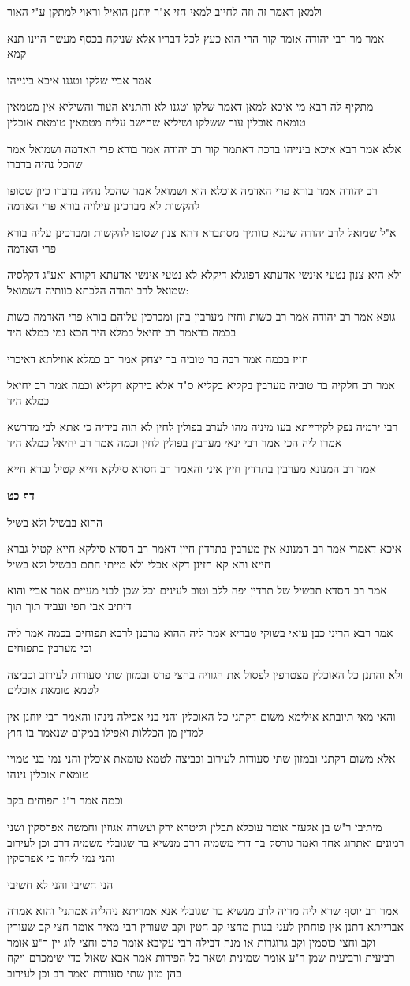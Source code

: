 \documentclass[12pt, openany]{book}
\newcommand{\sethebfont}{
\fontsize{10.5pt}{21.0pt} \selectfont
}
\newcommand{\textblock}[1]{
{\sethebfont #1\\}	
}
\newcommand{\sectname}{}
\newcommand{\newsection}[1]{
	\addcontentsline{toc}{section}{#1}
	\renewcommand{\sectname}{#1}	
	\vspace{-\baselineskip}
	\begin{center}
		\textbf{%
\fontsize{16pt}{16pt}\selectfont
			#1}
	\end{center}
	\vspace{-\baselineskip}
	\nopagebreak
}
\begin{document}
\textblock{ולמאן דאמר זה וזה לחיוב למאי חזי א"ר יוחנן הואיל וראוי למתקן ע"י האור}
\textblock{אמר מר רבי יהודה אומר קור הרי הוא כעץ לכל דבריו אלא שניקח בכסף מעשר היינו תנא קמא}
\textblock{אמר אביי שלקו וטגנו איכא בינייהו}
\textblock{מתקיף לה רבא מי איכא למאן דאמר שלקו וטגנו לא והתניא העור והשיליא אין מטמאין טומאת אוכלין עור ששלקו ושיליא שחישב עליה מטמאין טומאת אוכלין}
\textblock{אלא אמר רבא איכא בינייהו ברכה דאתמר קור רב יהודה אמר בורא פרי האדמה ושמואל אמר שהכל נהיה בדברו}
\textblock{רב יהודה אמר בורא פרי האדמה אוכלא הוא ושמואל אמר שהכל נהיה בדברו כיון שסופו להקשות לא מברכינן עילויה בורא פרי האדמה}
\textblock{א"ל שמואל לרב יהודה שיננא כוותיך מסתברא דהא צנון שסופו להקשות ומברכינן עליה בורא פרי האדמה}
\textblock{ולא היא צנון נטעי אינשי אדעתא דפוגלא דיקלא לא נטעי אינשי אדעתא דקורא ואע"ג דקלסיה שמואל לרב יהודה הלכתא כוותיה דשמואל:}
\textblock{גופא אמר רב יהודה אמר רב כשות וחזיז מערבין בהן ומברכין עליהם בורא פרי האדמה כשות בכמה כדאמר רב יחיאל כמלא היד הכא נמי כמלא היד}
\textblock{חזיז בכמה אמר רבה בר טוביה בר יצחק אמר רב כמלא אוזילתא דאיכרי}
\textblock{אמר רב חלקיה בר טוביה מערבין בקליא בקליא ס"ד אלא בירקא דקליא וכמה אמר רב יחיאל כמלא היד}
\textblock{רבי ירמיה נפק לקירייתא בעו מיניה מהו לערב בפולין לחין לא הוה בידיה כי אתא לבי מדרשא אמרו ליה הכי אמר רבי ינאי מערבין בפולין לחין וכמה אמר רב יחיאל כמלא היד}
\textblock{אמר רב המנונא מערבין בתרדין חיין איני והאמר רב חסדא סילקא חייא קטיל גברא חייא}
\newsection{דף כט}
\textblock{ההוא בבשיל ולא בשיל}
\textblock{איכא דאמרי אמר רב המנונא אין מערבין בתרדין חיין דאמר רב חסדא סילקא חייא קטיל גברא חייא והא קא חזינן דקא אכלי ולא מייתי התם בבשיל ולא בשיל}
\textblock{אמר רב חסדא תבשיל של תרדין יפה ללב וטוב לעינים וכל שכן לבני מעיים אמר אביי והוא דיתיב אבי תפי ועביד תוך תוך}
\textblock{אמר רבא הריני כבן עזאי בשוקי טבריא אמר ליה ההוא מרבנן לרבא תפוחים בכמה אמר ליה וכי מערבין בתפוחים}
\textblock{ולא והתנן כל האוכלין מצטרפין לפסול את הגוויה בחצי פרס ובמזון שתי סעודות לעירוב וכביצה לטמא טומאת אוכלים}
\textblock{והאי מאי תיובתא אילימא משום דקתני כל האוכלין והני בני אכילה נינהו והאמר רבי יוחנן אין למדין מן הכללות ואפילו במקום שנאמר בו חוץ}
\textblock{אלא משום דקתני ובמזון שתי סעודות לעירוב וכביצה לטמא טומאת אוכלין והני נמי בני טמויי טומאת אוכלין נינהו}
\textblock{וכמה אמר ר"נ תפוחים בקב}
\textblock{מיתיבי ר"ש בן אלעזר אומר עוכלא תבלין וליטרא ירק ועשרה אגוזין וחמשה אפרסקין ושני רמונים ואתרוג אחד ואמר גורסק בר דרי משמיה דרב מנשיא בר שגובלי משמיה דרב וכן לעירוב והני נמי ליהוו כי אפרסקין}
\textblock{הני חשיבי והני לא חשיבי}
\textblock{אמר רב יוסף שרא ליה מריה לרב מנשיא בר שגובלי אנא אמריתא ניהליה אמתני' והוא אמרה אברייתא דתנן אין פוחתין לעני בגורן מחצי קב חטין וקב שעורין רבי מאיר אומר חצי קב שעורין וקב וחצי כוסמין וקב גרוגרות או מנה דבילה רבי עקיבא אומר פרס וחצי לוג יין ר"ע אומר רביעית ורביעית שמן ר"ע אומר שמינית ושאר כל הפירות אמר אבא שאול כדי שימכרם ויקח בהן מזון שתי סעודות ואמר רב וכן לעירוב}
\end{document}
